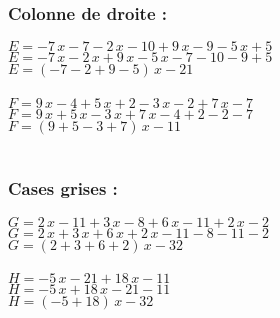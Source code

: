 \documentclass[a4paper,11pt]{article}
\begin{document}
  \subsubsection*{Colonne de droite :}
  \begin{multicols}{2}
    $E=-7\,x-7-2\,x-10+9\,x-9-5\,x+5$\\
    $E=-7\,x-2\,x+9\,x-5\,x-7-10-9+5$\\
    $E=\left( -7-2+9-5\right) \,x-21$
    \\
    \\

    $F=9\,x-4+5\,x+2-3\,x-2+7\,x-7$\\
    $F=9\,x+5\,x-3\,x+7\,x-4+2-2-7$\\
    $F=\left( 9+5-3+7\right) \,x-11$
    \\
    \\

  \end{multicols}
  \subsubsection*{Cases grises :}
  \begin{multicols}{2}
    $G=2\,x-11+3\,x-8+6\,x-11+2\,x-2$\\
    $G=2\,x+3\,x+6\,x+2\,x-11-8-11-2$\\
    $G=\left( 2+3+6+2\right) \,x-32$
    \\
    \\

    $H=-5\,x-21+18\,x-11$\\
    $H=-5\,x+18\,x-21-11$\\
    $H=\left( -5+18\right) \,x-32$
    \\
    \\

  \end{multicols}
\end{document}
